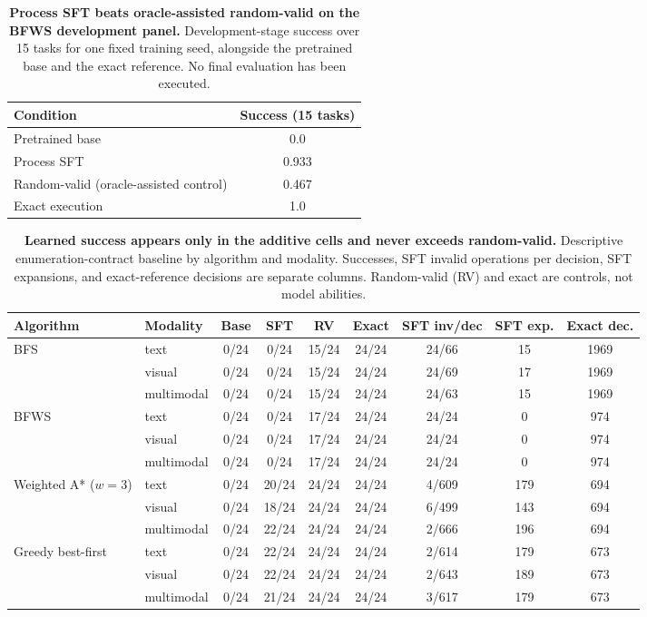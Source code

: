 \begin{table}[t]
\caption{\textbf{Process SFT beats oracle-assisted random-valid on the BFWS development panel.} Development-stage success over 15 tasks for one fixed training seed, alongside the pretrained base and the exact reference. No final evaluation has been executed.}
\label{tab:results-bfws}
\centering\footnotesize
\setlength{\tabcolsep}{4pt}
\begin{tabular}{lc}
\toprule[0.4mm]
\rowcolor{mygray}\textbf{Condition} & \textbf{Success (15 tasks)} \\
\midrule
Pretrained base & 0.0 \\
Process SFT & 0.933 \\
Random-valid (oracle-assisted control) & 0.467 \\
Exact execution & 1.0 \\
\bottomrule
\end{tabular}
\end{table}

\begin{table}[t]
\caption{\textbf{Learned success appears only in the additive cells and never exceeds random-valid.} Descriptive enumeration-contract baseline by algorithm and modality. Successes, SFT invalid operations per decision, SFT expansions, and exact-reference decisions are separate columns. Random-valid (RV) and exact are controls, not model abilities.}
\label{tab:results-primary-matrix}
\centering\footnotesize
\setlength{\tabcolsep}{2pt}
\begin{tabular}{@{}ll|cccc|cc|c@{}}
\toprule[0.4mm]
\rowcolor{mygray}\textbf{Algorithm} & \textbf{Modality} & \textbf{Base} & \textbf{SFT} & \textbf{RV} & \textbf{Exact} & \textbf{SFT inv/dec} & \textbf{SFT exp.} & \textbf{Exact dec.} \\
\midrule
\multirow{3}{*}{BFS} & text & 0/24 & 0/24 & 15/24 & 24/24 & 24/66 & 15 & 1969 \\
 & visual & 0/24 & 0/24 & 15/24 & 24/24 & 24/69 & 17 & 1969 \\
 & multimodal & 0/24 & 0/24 & 15/24 & 24/24 & 24/63 & 15 & 1969 \\
\midrule
\multirow{3}{*}{BFWS} & text & 0/24 & 0/24 & 17/24 & 24/24 & 24/24 & 0 & 974 \\
 & visual & 0/24 & 0/24 & 17/24 & 24/24 & 24/24 & 0 & 974 \\
 & multimodal & 0/24 & 0/24 & 17/24 & 24/24 & 24/24 & 0 & 974 \\
\midrule
\multirow{3}{*}{Weighted A* ($w{=}3$)} & text & 0/24 & 20/24 & 24/24 & 24/24 & 4/609 & 179 & 694 \\
 & visual & 0/24 & 18/24 & 24/24 & 24/24 & 6/499 & 143 & 694 \\
 & multimodal & 0/24 & 22/24 & 24/24 & 24/24 & 2/666 & 196 & 694 \\
\midrule
\multirow{3}{*}{Greedy best-first} & text & 0/24 & 22/24 & 24/24 & 24/24 & 2/614 & 179 & 673 \\
 & visual & 0/24 & 22/24 & 24/24 & 24/24 & 2/643 & 189 & 673 \\
 & multimodal & 0/24 & 21/24 & 24/24 & 24/24 & 3/617 & 179 & 673 \\
\bottomrule
\end{tabular}
\end{table}

